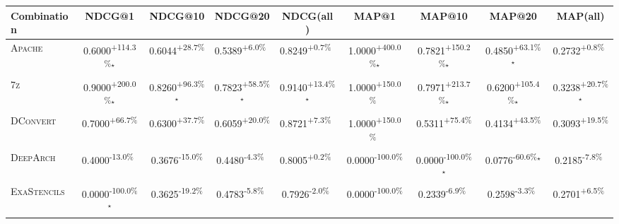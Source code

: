 \begin{table}[htbp]
\centering
\renewcommand{\arraystretch}{1.2}
\begin{tabular}{l|cccc|cccc}
\hline
Combination & NDCG@1 & NDCG@10 & NDCG@20 & NDCG(all) & MAP@1 & MAP@10 & MAP@20 & MAP(all) \\ \hline
\textsc{Apache} & \cellcolor{green!30}0.6000\textsuperscript{+114.3\%}$^\star$ & \cellcolor{green!30}0.6044\textsuperscript{+28.7\%}$^{\,\,\,}$ & \cellcolor{green!30}0.5389\textsuperscript{+6.0\%}$^{\,\,\,}$ & \cellcolor{green!30}0.8249\textsuperscript{+0.7\%}$^{\,\,\,}$ & \cellcolor{green!30}1.0000\textsuperscript{+400.0\%}$^\star$ & \cellcolor{green!30}0.7821\textsuperscript{+150.2\%}$^\star$ & \cellcolor{green!30}0.4850\textsuperscript{+63.1\%}$^\star$ & \cellcolor{green!30}0.2732\textsuperscript{+0.8\%}$^{\,\,\,}$ \\
\textsc{7z} & \cellcolor{green!30}0.9000\textsuperscript{+200.0\%}$^\star$ & \cellcolor{green!30}0.8260\textsuperscript{+96.3\%}$^\star$ & \cellcolor{green!30}0.7823\textsuperscript{+58.5\%}$^\star$ & \cellcolor{green!30}0.9140\textsuperscript{+13.4\%}$^\star$ & \cellcolor{green!30}1.0000\textsuperscript{+150.0\%}$^{\,\,\,}$ & \cellcolor{green!30}0.7971\textsuperscript{+213.7\%}$^\star$ & \cellcolor{green!30}0.6200\textsuperscript{+105.4\%}$^\star$ & \cellcolor{green!30}0.3238\textsuperscript{+20.7\%}$^\star$ \\
\textsc{DConvert} & \cellcolor{green!30}0.7000\textsuperscript{+66.7\%}$^{\,\,\,}$ & \cellcolor{green!30}0.6300\textsuperscript{+37.7\%}$^{\,\,\,}$ & \cellcolor{green!30}0.6059\textsuperscript{+20.0\%}$^{\,\,\,}$ & \cellcolor{green!30}0.8721\textsuperscript{+7.3\%}$^{\,\,\,}$ & \cellcolor{green!30}1.0000\textsuperscript{+150.0\%}$^{\,\,\,}$ & \cellcolor{green!30}0.5311\textsuperscript{+75.4\%}$^{\,\,\,}$ & \cellcolor{green!30}0.4134\textsuperscript{+43.5\%}$^{\,\,\,}$ & \cellcolor{green!30}0.3093\textsuperscript{+19.5\%}$^{\,\,\,}$ \\
\textsc{DeepArch} & \cellcolor{red!30}0.4000\textsuperscript{-13.0\%}$^{\,\,\,}$ & \cellcolor{red!30}0.3676\textsuperscript{-15.0\%}$^{\,\,\,}$ & \cellcolor{red!30}0.4480\textsuperscript{-4.3\%}$^{\,\,\,}$ & \cellcolor{green!30}0.8005\textsuperscript{+0.2\%}$^{\,\,\,}$ & \cellcolor{red!30}0.0000\textsuperscript{-100.0\%}$^{\,\,\,}$ & \cellcolor{red!30}0.0000\textsuperscript{-100.0\%}$^\star$ & \cellcolor{red!30}0.0776\textsuperscript{-60.6\%}$^\star$ & \cellcolor{red!30}0.2185\textsuperscript{-7.8\%}$^{\,\,\,}$ \\
\textsc{ExaStencils} & \cellcolor{red!30}0.0000\textsuperscript{-100.0\%}$^\star$ & \cellcolor{red!30}0.3625\textsuperscript{-19.2\%}$^{\,\,\,}$ & \cellcolor{red!30}0.4783\textsuperscript{-5.8\%}$^{\,\,\,}$ & \cellcolor{red!30}0.7926\textsuperscript{-2.0\%}$^{\,\,\,}$ & \cellcolor{red!30}0.0000\textsuperscript{-100.0\%}$^{\,\,\,}$ & \cellcolor{red!30}0.2339\textsuperscript{-6.9\%}$^{\,\,\,}$ & \cellcolor{red!30}0.2598\textsuperscript{-3.3\%}$^{\,\,\,}$ & \cellcolor{green!30}0.2701\textsuperscript{+6.5\%}$^{\,\,\,}$ \\

\end{tabular}
\end{table}
